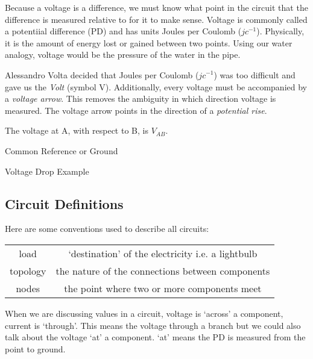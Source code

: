 \documentclass[12pt]{article}
\begin{document}
Because a voltage is a difference, we must know what point in the circuit that the difference is measured relative to for it to make sense.
Voltage is commonly called a potentiial difference (PD) and has units Joules per Coulomb ($\unit{jc}^{-1}$).
Physically, it is the amount of energy lost or gained between two points. 
Using our water analogy, voltage would be the pressure of the water in the pipe.

Alessandro Volta decided that Joules per Coulomb ($\unit{jc}^{-1}$) was too difficult and gave us the \textit{Volt} (symbol V).
Additionally, every voltage must be accompanied by a \textit{voltage arrow}. 
This removes the ambiguity in which direction voltage is measured. 
The voltage arrow points in the direction of a \textit{potential rise}.

The voltage at A, with respect to B, is $V_{AB}$. 

\begin{theorem*}
  Common Reference or Ground 
\end{theorem*}

\begin{example}
  Voltage Drop Example
\end{example}

\subsection{Circuit Definitions}
Here are some conventions used to describe all circuits:

\begin{tabular}{c|c}
load & `destination' of the electricity i.e. a lightbulb \\
topology & the nature of the connections between components \\
nodes & the point where two or more components meet \\
\end{tabular}

When we are discussing values in a circuit, voltage is `across' a component, current is `through'. 
This means the voltage through a branch but we could also talk about the voltage `at' a component.
`at' means the PD is measured from the point to ground.
\end{document}
